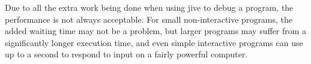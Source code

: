 Due to all the extra work being done when using jive to debug a program, the performance is not always acceptable.
For small non-interactive programs, the added waiting time may not be a problem, but larger programs may suffer from a significantly longer execution time, and even simple interactive programs can use up to a second to respond to input on a fairly powerful computer.
~\\





